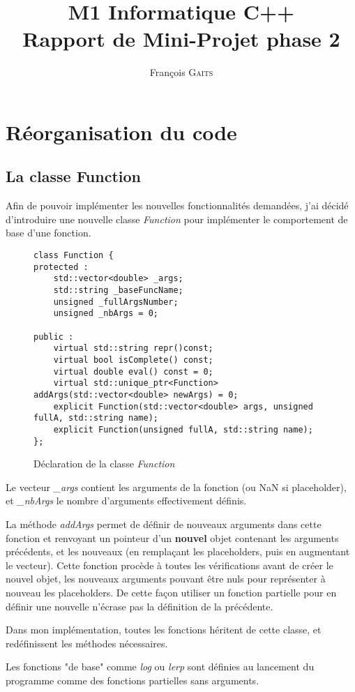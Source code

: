 \documentclass[]{article}
\author{François G\textsc{aits}}
\title{M1 Informatique C++\\Rapport de Mini-Projet phase 2}
\begin{document}
\maketitle
\section{Réorganisation du code}
\subsection{La classe Function}
Afin de pouvoir implémenter les nouvelles fonctionnalités demandées, j'ai décidé d'introduire une nouvelle classe \textit{Function} pour implémenter le comportement de base d'une fonction.

\begin{figure}[h]
\centering
\begin{lstlisting}
class Function {
protected :
	std::vector<double> _args;
	std::string _baseFuncName;
	unsigned _fullArgsNumber;
	unsigned _nbArgs = 0;

public :
	virtual std::string repr()const;
	virtual bool isComplete() const;
	virtual double eval() const = 0;
	virtual std::unique_ptr<Function> addArgs(std::vector<double> newArgs) = 0;
	explicit Function(std::vector<double> args, unsigned fullA, std::string name);
	explicit Function(unsigned fullA, std::string name);
};
\end{lstlisting}
\caption{Déclaration de la classe \textit{Function}}
\end{figure} 
Le vecteur \textit{\_args} contient les arguments de la fonction (ou NaN si placeholder), et \textit{\_nbArgs} le nombre d'arguments effectivement définis.

La méthode \textit{addArgs} permet de définir de nouveaux arguments dans cette fonction et renvoyant un pointeur d'un \textbf{nouvel} objet contenant les arguments précédents, et les nouveaux (en remplaçant les placeholders, puis en augmentant le vecteur). Cette fonction procède à toutes les vérifications avant de créer le nouvel objet, les nouveaux arguments pouvant être nuls pour représenter à nouveau les placeholders. De cette façon utiliser un fonction partielle pour en définir une nouvelle n'écrase pas la définition de la précédente.

Dans mon implémentation, toutes les fonctions héritent de cette classe, et redéfinissent les méthodes nécessaires.

Les fonctions "de base" comme \textit{log} ou \textit{lerp} sont définies au lancement du programme comme des fonctions partielles sans arguments.
\end{document}
